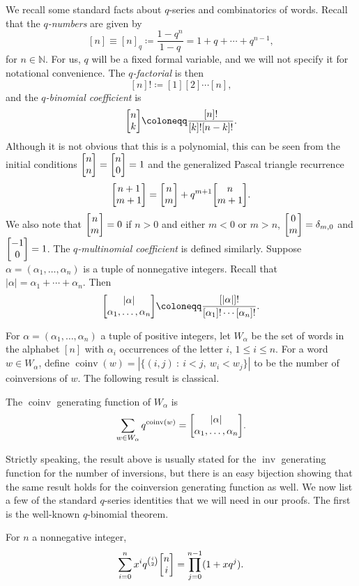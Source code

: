 \documentclass[ALCO,Unicode]{cedram}
\DeclareMathOperator{\inv}{inv}
\DeclareMathOperator{\coinv}{coinv}
\newcommand{\qbinom}[2]{\bgroup\renewcommand*{\arraystretch}{1}\begin{bmatrix} #1 \\ #2\end{bmatrix} \egroup}
\begin{document}
We recall some standard facts about $q$-series and combinatorics of words. 
Recall that the {\em $q$-numbers} are given by 
\[
[n] \equiv [n]_q \coloneqq \frac{1-q^n}{1-q} = 1 + q + \cdots + q^{n-1}, 
\]
for $n \in \mathbb{N}$. For us, $q$ will be a fixed formal variable,
and we will not specify it for notational convenience.
The {\em $q$-factorial} is then
\[
[n]! \coloneqq [1] [2] \cdots [n],
\]
and the {\em $q$-binomial coefficient} is
\[
\qbinom nk \coloneqq \frac{[n]!}{[k]! [n-k]!}.
\]
Although it is not obvious that this is a polynomial, this can be seen
from the initial conditions $\qbinom nn = \qbinom n0 = 1$
and the generalized Pascal triangle recurrence
\begin{equation}
\label{qbinom-recur}
\qbinom {n+1}{m+1} = \qbinom nm + q^{m+1} \qbinom n{m+1}.
\end{equation}
We also note that $\qbinom nm = 0$ if $n > 0$ and either $m < 0$ or $m > n$, $\qbinom {0}m = \delta_{m,0}$ and $\qbinom {-1}0 = 1$.
The  {\em $q$-multinomial coefficient} is defined similarly. Suppose 
$\alpha = (\alpha_1,\dots, \allowbreak \alpha_n)$ is a tuple of nonnegative integers.
Recall that $|\alpha| = \alpha_1 + \cdots + \alpha_n$. Then
\[
\qbinom{|\alpha|}{\alpha_1,\dots,\alpha_n} \coloneqq \frac{[|\alpha|]!}{[\alpha_1]! \cdots [\alpha_n]!}.
\]


For $\alpha = (\alpha_1,\dots, \alpha_n)$ a tuple of positive integers, let $W_\alpha$
be the set of words in the alphabet $[n]$ with $\alpha_i$ occurrences of the letter $i$,
$1 \leq i \leq n$. For a word $w\in W_{\alpha}$, define $\coinv(w) = |\{(i,j)\ :\ i<j,\ w_i<w_j\}|$ to be the number of coinversions of $w$. The following result is classical.

\begin{proposition}
\label{prop:coinv-gf}
The $\coinv$ generating function of $W_\alpha$ is
\[
\sum_{w \in W_\alpha} q^{\coinv(w)} = \qbinom{|\alpha|}{\alpha_1,\dots,\alpha_n}.
\]
\end{proposition}

Strictly speaking, the result above is usually stated for the $\inv$ generating function for the number of inversions, but there is an easy bijection showing that the same result holds for the coinversion generating function as well.
We now list a few of the standard $q$-series identities that we will need in our proofs. The first is the 
well-known $q$-binomial theorem.

\begin{proposition}
\label{prop:qbinom}
For $n$ a nonnegative integer,
\[
\sum_{i=0}^n x^i q^{\binom{i}{2}} \qbinom ni = \prod_{j=0}^{n-1} (1 + x q^j).
\]
\end{proposition}
\end{document}
